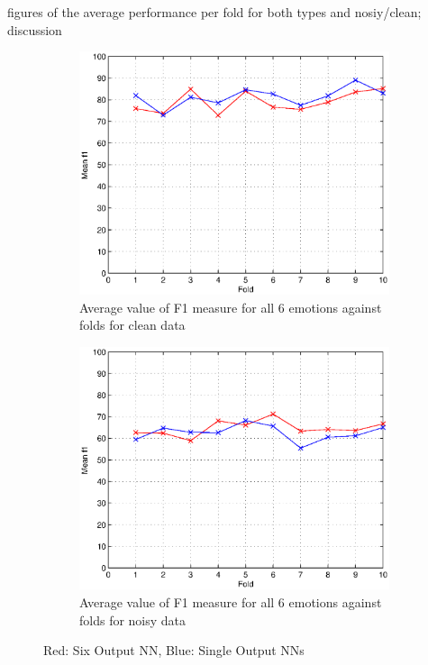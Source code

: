 \documentclass[10pt,a4paper]{article}
\begin{document}
figures of the average performance per fold for both types and nosiy/clean; discussion

\begin{figure}[!ht]
	\centering
	\begin{subfigure}[b]{0.7\textwidth}
		\includegraphics[width=\textwidth]{images/clean_fold_f1_plot.eps}
     	\caption{Average value of F1 measure for all 6 emotions against folds for clean data}
     	\label{fig:avgF1Clean}
    \end{subfigure}
	\begin{subfigure}[b]{0.7\textwidth}
		\includegraphics[width=\textwidth]{images/noisy_fold_f1_plot.eps}
     	\caption{Average value of F1 measure for all 6 emotions against folds for noisy data}
     	\label{fig:avgF1Noisy}
    \end{subfigure}
    \caption{Red: Six Output NN, Blue: Single Output NNs}
    \label{fig:avgF1}
\end{figure}
\end{document}
